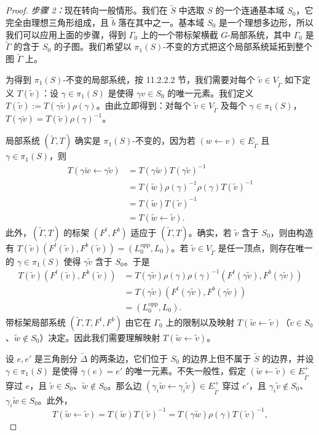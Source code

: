 \begin{proof}
\emph{步骤 2：}现在转向一般情形。我们在 $\tilde S$ 中选取 $S$ 的一个连通基本域 $S_0$，它完全由理想三角形组成，且 $\tilde b$ 落在其中之一。基本域 $S_0$ 是一个理想多边形，所以我们可以应用上面的步骤，得到 $\Gamma_0$ 上的一个带标架横截 $G$-局部系统，其中 $\Gamma_0$ 是 $\tilde\Gamma$ 的含于 $S_0$ 的子图。我们希望以 $\pi_1(S)$-不变的方式把这个局部系统延拓到整个图 $\tilde\Gamma$ 上。

为得到 $\pi_1(S)$-不变的局部系统，按 11.2.2.2 节，我们需要对每个 $\tilde v\in V_{\tilde\Gamma}$ 如下定义 $T(\tilde v)$：设 $\gamma\in\pi_1(S)$ 是使得 $\gamma v\in S_0$ 的唯一元素。我们定义 $T(\tilde v):=T(\gamma\tilde v)\rho(\gamma)$。由此立即得到：对每个 $\tilde v\in V_{\tilde\Gamma}$ 及每个 $\gamma\in\pi_1(S)$，$T(\gamma\tilde v)=T(\tilde v)\rho(\gamma)^{-1}$。

局部系统 $(\tilde\Gamma,T)$ 确实是 $\pi_1(S)$-不变的，因为若 $(w\leftarrow v)\in E_{\tilde\Gamma}$ 且 $\gamma\in\pi_1(S)$，则
\begin{align*}
T(\gamma\tilde w\leftarrow\gamma\tilde v)&=T(\gamma\tilde w)T(\gamma\tilde v)^{-1}\\
&=T(\tilde w)\rho(\gamma)^{-1}\rho(\gamma)T(\tilde v)^{-1}\\
&=T(\tilde w)T(\tilde v)^{-1}\\
&=T(\tilde w\leftarrow\tilde v).
\end{align*}
此外，$(\tilde\Gamma,T)$ 的标架 $(F^{t},F^{b})$ 适应于 $(\tilde\Gamma,T)$。确实，若 $\tilde v$ 含于 $S_0$，则由构造有 $T(\tilde v)(F^{t}(\tilde v),F^{b}(\tilde v))=(L_0^{\mathrm{opp}},L_0)$。若 $\tilde v\in V_{\tilde\Gamma}$ 是任一顶点，则存在唯一的 $\gamma\in\pi_1(S)$ 使得 $\gamma\tilde v$ 含于 $S_0$。于是
\begin{align*}
T(\tilde v)(F^{t}(\tilde v),F^{b}(\tilde v))
&=T(\gamma\tilde v)\rho(\gamma)\rho(\gamma)^{-1}(F^{t}(\gamma\tilde v),F^{b}(\gamma\tilde v))\\
&=T(\gamma\tilde v)(F^{t}(\gamma\tilde v),F^{b}(\gamma\tilde v))\\
&=(L_0^{\mathrm{opp}},L_0).
\end{align*}
带标架局部系统 $(\tilde\Gamma,T,F^{t},F^{b})$ 由它在 $\Gamma_0$ 上的限制以及映射 $T(\tilde w\leftarrow\tilde v)$（$\tilde v\in S_0$、$\tilde w\notin S_0$）决定。因此我们需要理解映射 $T(\tilde w\leftarrow\tilde v)$。

设 $e,e'$ 是三角剖分 $\tilde\Delta$ 的两条边，它们位于 $S_0$ 的边界上但不属于 $\tilde S$ 的边界，并设 $\gamma\in\pi_1(S)$ 是使得 $\gamma(e)=e'$ 的唯一元素。不失一般性，假定 $(\tilde w\leftarrow\tilde v)\in E_{\tilde\Gamma}^{+}$ 穿过 $e$，且 $\tilde v\in S_0$、$\tilde w\notin S_0$。那么边 $(\gamma_i\tilde w\leftarrow\gamma_i\tilde v)\in E_{\tilde\Gamma}^{+}$ 穿过 $e'$，且 $\gamma_i\tilde v\notin S_0$、$\gamma_i\tilde w\in S_0$。此外，
\[
T(\tilde w\leftarrow\tilde v)=T(\tilde w)T(\tilde v)^{-1}=T(\gamma\tilde w)\rho(\gamma)T(\tilde v)^{-1},
\]


\end{proof}
